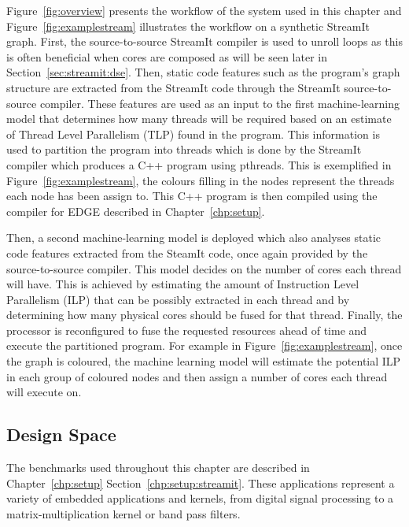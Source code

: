 Figure~\ref{fig:overview} presents the workflow of the system used in this chapter and Figure~\ref{fig:examplestream} illustrates the workflow on a synthetic StreamIt graph.
First, the source-to-source StreamIt compiler is used to unroll loops as this is often beneficial when cores are composed as will be seen later in Section~\ref{sec:streamit:dse}.
Then, static code features such as the program's graph structure are extracted from the StreamIt code through the StreamIt source-to-source compiler.
These features are used as an input to the first machine-learning model that determines how many threads will be required based on an estimate of Thread Level Parallelism (TLP) found in the program.
This information is used to partition the program into threads which is done by the StreamIt compiler which produces a C++ program using pthreads.
This is exemplified in Figure~\ref{fig:examplestream}, the colours filling in the nodes represent the threads each node has been assign to.
This C++ program is then compiled using the compiler for EDGE described in Chapter~\ref{chp:setup}.

Then, a second machine-learning model is deployed which also analyses static code features extracted from the SteamIt code, once again provided by the source-to-source compiler.
This model decides on the number of cores each thread will have.
This is achieved by estimating the amount of Instruction Level Parallelism (ILP) that can be possibly extracted in each thread and by determining how many physical cores should be fused for that thread.
Finally, the processor is reconfigured to fuse the requested resources ahead of time and execute the partitioned program.
For example in Figure~\ref{fig:examplestream}, once the graph is coloured, the machine learning model will estimate the potential ILP in each group of coloured nodes and then assign a number of cores each thread will execute on.

\subsection{Design Space}

The benchmarks used throughout this chapter are described in Chapter~\ref{chp:setup} Section~\ref{chp:setup:streamit}.
These applications represent a variety of embedded applications and kernels, from digital signal processing to a matrix-multiplication kernel or band pass filters.

